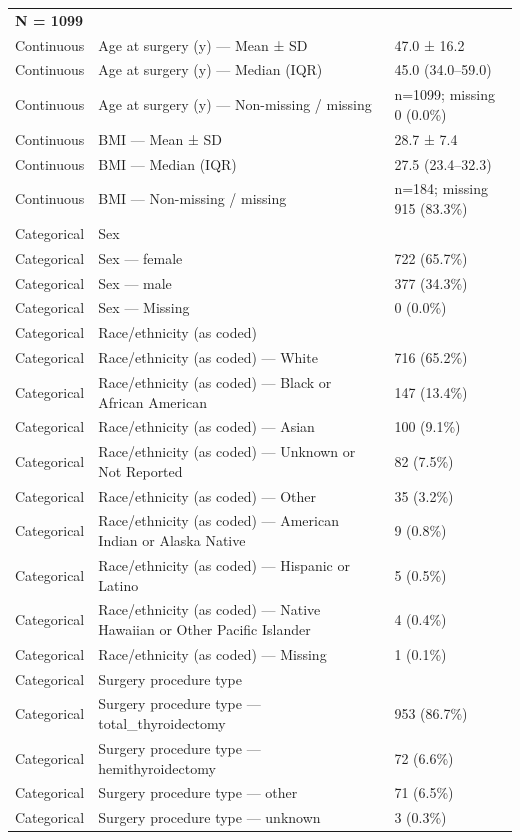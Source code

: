 \begin{table}[htbp]
\begin{tabular}{lll}
\multicolumn{3}{l}{\textbf{N = 1099}} \\
Continuous & Age at surgery (y) — Mean ± SD & 47.0 ± 16.2 \\
Continuous & Age at surgery (y) — Median (IQR) & 45.0 (34.0–59.0) \\
Continuous & Age at surgery (y) — Non-missing / missing & n=1099; missing 0 (0.0\%) \\
Continuous & BMI — Mean ± SD & 28.7 ± 7.4 \\
Continuous & BMI — Median (IQR) & 27.5 (23.4–32.3) \\
Continuous & BMI — Non-missing / missing & n=184; missing 915 (83.3\%) \\
Categorical & Sex &  \\
Categorical & Sex — female & 722 (65.7\%) \\
Categorical & Sex — male & 377 (34.3\%) \\
Categorical & Sex — Missing & 0 (0.0\%) \\
Categorical & Race/ethnicity (as coded) &  \\
Categorical & Race/ethnicity (as coded) — White & 716 (65.2\%) \\
Categorical & Race/ethnicity (as coded) — Black or African American & 147 (13.4\%) \\
Categorical & Race/ethnicity (as coded) — Asian & 100 (9.1\%) \\
Categorical & Race/ethnicity (as coded) — Unknown or Not Reported & 82 (7.5\%) \\
Categorical & Race/ethnicity (as coded) — Other & 35 (3.2\%) \\
Categorical & Race/ethnicity (as coded) — American Indian or Alaska Native & 9 (0.8\%) \\
Categorical & Race/ethnicity (as coded) — Hispanic or Latino & 5 (0.5\%) \\
Categorical & Race/ethnicity (as coded) — Native Hawaiian or Other Pacific Islander & 4 (0.4\%) \\
Categorical & Race/ethnicity (as coded) — Missing & 1 (0.1\%) \\
Categorical & Surgery procedure type &  \\
Categorical & Surgery procedure type — total\_thyroidectomy & 953 (86.7\%) \\
Categorical & Surgery procedure type — hemithyroidectomy & 72 (6.6\%) \\
Categorical & Surgery procedure type — other & 71 (6.5\%) \\
Categorical & Surgery procedure type — unknown & 3 (0.3\%) \\

\end{tabular}
\end{table}
